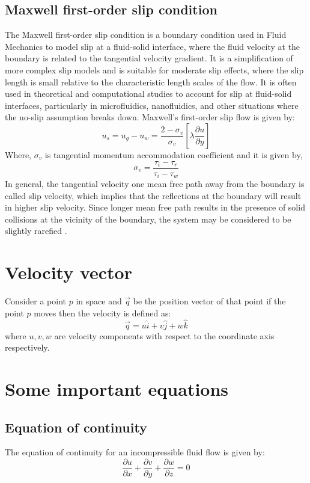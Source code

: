 \documentclass[14pt,one side, a4paper]{extbook}
\begin{document}
	 \subsection{Maxwell first-order slip condition}
	 The Maxwell first-order slip condition is a boundary condition used in Fluid Mechanics to model slip at a fluid-solid interface, where the fluid velocity at the boundary is related to the tangential velocity gradient. It is a simplification of more complex slip models and is suitable for moderate slip effects, where the slip length is small relative to the characteristic length scales of the flow. It is often used in theoretical and computational studies to account for slip at fluid-solid interfaces, particularly in microfluidics, nanofluidics, and other situations where the no-slip assumption breaks down. Maxwell's first-order slip flow is given by:
	 \begin{equation}
	 u_{s}=u_{g}-u_{w}=\frac{2-\sigma_{v}}{\sigma_{v}}\left[\lambda\frac{\partial u}{\partial y}\right]
	\end{equation}
	 Where, $\sigma_{v}$ is tangential momentum accommodation coefficient and it is given by, $$\sigma_{v}=\frac{\tau_{i}-\tau_{r}}{\tau_{i}-\tau_{w}}$$
	 In general, the tangential velocity one mean free path away from the boundary is called slip velocity, which implies that the reflections at the boundary will result in higher slip velocity. Since longer mean free path results in the presence of solid collisions at the vicinity of the boundary, the system  may be considered to be slightly rarefied \cite{shu}.
	 \section{Velocity vector} Consider a point $p$ in space and $\vec{q}$ be the position vector of that point if the point $p$ moves then the velocity is defined as:
	 $$\vec{q}=u\hat{i}+v\hat{j}+w\hat{k}$$
	 where $u,v,w$ are velocity components with respect to  the coordinate axis respectively.
	 \section{Some important equations}
	 	\subsection{Equation of continuity}
	 	The equation of continuity for an incompressible fluid flow is given by:
	 	\begin{equation}
	 	\frac{\partial{u}}{\partial{x}}+\frac{\partial{v}}{\partial{y}}+\frac{\partial{w}}{\partial{z}}=0
	    \end{equation}
\end{document}
